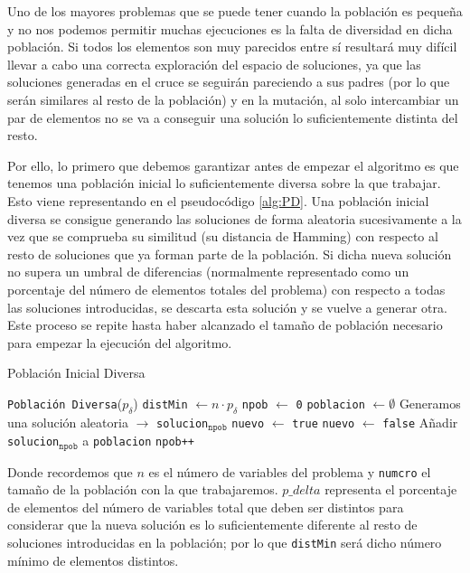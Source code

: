 Uno de los mayores problemas que se puede tener cuando la población es pequeña y no nos podemos permitir muchas ejecuciones es la falta de diversidad en dicha población. 
Si todos los elementos son muy parecidos entre sí resultará muy difícil llevar a cabo una correcta exploración del espacio de soluciones, ya que las soluciones generadas en el cruce se seguirán pareciendo a sus padres (por lo que serán similares al resto de la población) y en la mutación, al solo intercambiar un par de elementos no se va a conseguir una solución lo suficientemente distinta del resto. 

Por ello, lo primero que debemos garantizar antes de empezar el algoritmo es que tenemos una población inicial lo suficientemente diversa sobre la que trabajar. 
Esto viene representando en el pseudocódigo \ref{alg:PD}. 
Una población inicial diversa se consigue generando las soluciones de forma aleatoria sucesivamente a la vez que se comprueba su similitud (su distancia de Hamming) con respecto al resto de soluciones que ya forman parte de la población. 
Si dicha nueva solución no supera un umbral de diferencias (normalmente representado como un porcentaje del número de elementos totales del problema) con respecto a todas las soluciones introducidas, se descarta esta solución y se vuelve a generar otra. 
Este proceso se repite hasta haber alcanzado el tamaño de población necesario para empezar la ejecución del algoritmo.

\begin{algorithm}
\caption{Población Inicial Diversa}\label{alg:PD}
\begin{algorithmic}[1]
\Procedure \texttt{Población Diversa}($p_\delta$)
\State \texttt{distMin} $\xleftarrow{}{} n\cdot p_\delta$
\State \texttt{npob} $\xleftarrow{}{}$ \texttt{0}
\State \texttt{poblacion} $\xleftarrow{}{} \emptyset$
	\State Generamos una solución aleatoria $\xrightarrow{}{}$ \texttt{solucion}$_{\texttt{npob}}$
	\State \texttt{nuevo} $\xleftarrow{}{}$ \texttt{true}
			\State \texttt{nuevo} $\xleftarrow{}{}$ \texttt{false}
		\EndIf
	\EndFor
		\State Añadir \texttt{solucion}$_{\texttt{npob}}$ a \texttt{poblacion}
		\State \texttt{npob++}
	\EndIf
\EndWhile
\EndProcedure
\end{algorithmic}
\end{algorithm}

Donde recordemos que $n$ es el número de variables del problema y \texttt{numcro} el tamaño de la población con la que trabajaremos. 
$p\_delta$ representa el porcentaje de elementos del número de variables total que deben ser distintos para considerar que la nueva solución es lo suficientemente diferente al resto de soluciones introducidas en la población; por lo que \texttt{distMin} será dicho número mínimo de elementos distintos. 

